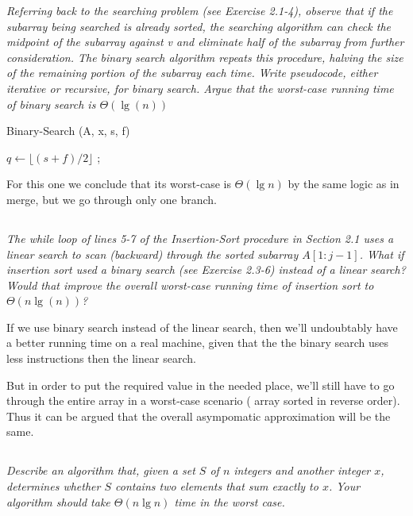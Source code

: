 \documentclass[11pt,oneside,titlepage]{book}
\begin{document}
\textit{Referring back to the searching problem (see Exercise 2.1-4), observe that if the
  subarray being searched is already sorted, the searching algorithm can check the
  midpoint of the subarray against v and eliminate half of the subarray from further
  consideration. The binary search algorithm repeats this procedure, halving the
  size of the remaining portion of the subarray each time. Write pseudocode, either
  iterative or recursive, for binary search. Argue that the worst-case running time of
  binary search is $\Theta(\lg(n))$}

\begin{function}
  \caption{Binary-Search (A, x, s, f)}
   {
    \;
  }
  $q \leftarrow \lfloor (s + f)/2\rfloor$\;
   {
    ;
  }{
    {
       \;
    }
    {
       \;
    }
  }
\end{function}

For this one we conclude that its worst-case is $\Theta(\lg n)$ by the same logic as in merge,
but we go through only one branch.

\subsection{}

\textit{The while loop of lines 5-7 of the Insertion-Sort procedure in Section 2.1
  uses a linear search to scan (backward) through the sorted subarray $A[1:j - 1]$.
  What if insertion sort used a binary search (see Exercise 2.3-6) instead of a linear
  search? Would that improve the overall worst-case running time of insertion sort
  to $\Theta(n \lg(n))$?}

If we use binary search instead of the linear search, then we'll undoubtably  have a
better running time on a real machine, given that the the binary search uses less instructions
then the linear search.

But in order to put the required value in the needed place, we'll still have to go
through the entire array in a worst-case scenario ( array sorted in reverse order). Thus
it can be argued that the overall asympomatic approximation will be the same.

\subsection{}

\textit{Describe an algorithm that, given a set $S$ of $n$ integers and another integer $x$,
determines whether $S$ contains two elements that sum exactly to $x$. Your algorithm
should take $\Theta (n \lg n)$ time in the worst case.}
\end{document}
